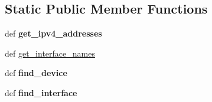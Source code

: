 \subsection*{Static Public Member Functions}
\begin{DoxyCompactItemize}
\item 
\hypertarget{classcore_1_1misc_1_1xmldeployment_1_1_core_deployment_writer_a3a9facb82f9349428da4795aa07d3e16}{def {\bfseries get\+\_\+ipv4\+\_\+addresses}}\label{classcore_1_1misc_1_1xmldeployment_1_1_core_deployment_writer_a3a9facb82f9349428da4795aa07d3e16}

\item 
def \hyperlink{classcore_1_1misc_1_1xmldeployment_1_1_core_deployment_writer_abf168667fd4b8846d4f8403a2273d98e}{get\+\_\+interface\+\_\+names}
\item 
\hypertarget{classcore_1_1misc_1_1xmldeployment_1_1_core_deployment_writer_a31b6b31c8f5222ba63e682c9cb295d60}{def {\bfseries find\+\_\+device}}\label{classcore_1_1misc_1_1xmldeployment_1_1_core_deployment_writer_a31b6b31c8f5222ba63e682c9cb295d60}

\item 
\hypertarget{classcore_1_1misc_1_1xmldeployment_1_1_core_deployment_writer_a9d7d5a2ef5827acf22db94c6edd226d8}{def {\bfseries find\+\_\+interface}}\label{classcore_1_1misc_1_1xmldeployment_1_1_core_deployment_writer_a9d7d5a2ef5827acf22db94c6edd226d8}

\end{DoxyCompactItemize}

